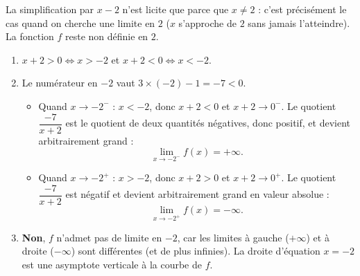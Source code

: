 \documentclass[11pt]{article}
\begin{document}
\begin{attention}
La simplification par $x-2$ n'est licite que parce que $x\neq 2$ : c'est précisément le cas quand on cherche une limite en $2$ ($x$ s'approche de $2$ sans jamais l'atteindre). La fonction $f$ reste non définie en $2$.
\end{attention}

\begin{corrige}
\begin{enumerate}
\item $x+2>0 \iff x>-2$ et $x+2<0 \iff x<-2$.
\item Le numérateur en $-2$ vaut $3\times(-2)-1=-7<0$.
\begin{itemize}
\item Quand $x\to -2^-$ : $x<-2$, donc $x+2<0$ et $x+2\to 0^-$. Le quotient $\dfrac{-7}{x+2}$ est le quotient de deux quantités négatives, donc positif, et devient arbitrairement grand :
\[ \lim_{x\to -2^-}f(x)=+\infty. \]
\item Quand $x\to -2^+$ : $x>-2$, donc $x+2>0$ et $x+2\to 0^+$. Le quotient $\dfrac{-7}{x+2}$ est négatif et devient arbitrairement grand en valeur absolue :
\[ \lim_{x\to -2^+}f(x)=-\infty. \]
\end{itemize}
\item \textbf{Non}, $f$ n'admet pas de limite en $-2$, car les limites à gauche ($+\infty$) et à droite ($-\infty$) sont différentes (et de plus infinies). La droite d'équation $x=-2$ est une asymptote verticale à la courbe de $f$.
\end{enumerate}
\end{corrige}
\end{document}
